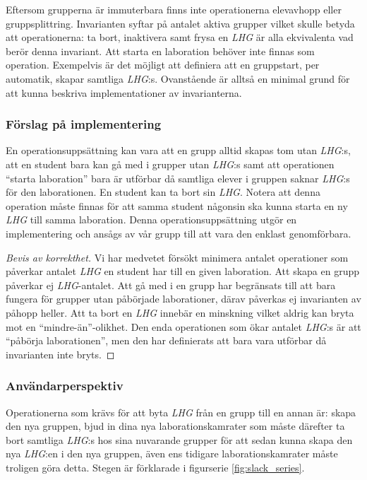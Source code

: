 Eftersom grupperna är immuterbara finns inte operationerna elevavhopp eller gruppsplittring. Invarianten syftar på antalet aktiva grupper vilket skulle betyda att operationerna: ta bort, inaktivera samt frysa en \emph{LHG} är alla ekvivalenta vad berör denna invariant.  Att starta en laboration behöver inte finnas som operation. Exempelvis är det möjligt att definiera att en gruppstart, per automatik, skapar samtliga \emph{LHG}:s. Ovanstående är alltså en minimal grund för att kunna beskriva implementationer av invarianterna.

\subsubsection{Förslag på implementering}
En operationsuppsättning kan vara att en grupp alltid skapas tom utan \emph{LHG}:s, att en student bara kan gå med i grupper utan \emph{LHG}:s samt att operationen “starta laboration” bara är utförbar då samtliga elever i gruppen saknar \emph{LHG}:s för den laborationen. En student kan ta bort sin \emph{LHG}. Notera att denna operation måste finnas för att samma student någonsin ska kunna starta en ny \emph{LHG} till samma laboration. Denna operationsuppsättning utgör en implementering och ansågs av vår grupp till att vara den enklast genomförbara.


\begin{proof}[Bevis av korrekthet]
  Vi har medvetet försökt minimera antalet operationer som påverkar antalet \emph{LHG} en student har till en given laboration. Att skapa en grupp påverkar ej \emph{LHG}-antalet. Att gå med i en grupp har begränsats till att bara fungera för grupper utan påbörjade laborationer, därav påverkas ej invarianten av påhopp heller. Att ta bort en \emph{LHG} innebär en minskning vilket aldrig kan bryta mot en “mindre-än”-olikhet. Den enda operationen som ökar antalet \emph{LHG}:s är att “påbörja laborationen”, men den har definierats att bara vara utförbar då invarianten inte bryts. \qedhere
\end{proof}

\subsubsection{Användarperspektiv}
Operationerna som krävs för att byta \emph{LHG} från en grupp till en annan är: skapa den nya gruppen, bjud in dina nya laborationskamrater som måste därefter ta bort samtliga \emph{LHG}:s hos sina nuvarande grupper för att sedan kunna skapa den nya \emph{LHG}:en i den nya gruppen, även ens tidigare laborationskamrater måste troligen göra detta. Stegen är förklarade i  figurserie \ref{fig:slack_series}.

